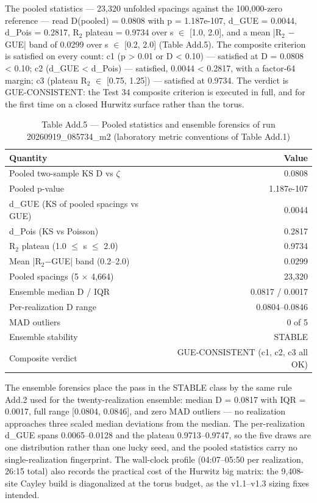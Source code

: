 \documentclass[10pt]{article}
\begin{document}
The pooled statistics --- 23,320 unfolded spacings against the 100,000-zero reference --- read D(pooled) = 0.0808 with p = 1.187e-107, d\_GUE = 0.0044, d\_Pois = 0.2817, R$_2$ plateau = 0.9734 over s $\in$ [1.0, 2.0], and a mean |R$_2$ $-$ GUE| band of 0.0299 over s $\in$ [0.2, 2.0] (Table Add.5). The composite criterion is satisfied on every count: c1 (p > 0.01 or D < 0.10) --- satisfied at D = 0.0808 < 0.10; c2 (d\_GUE < d\_Pois) --- satisfied, 0.0044 < 0.2817, with a factor-64 margin; c3 (plateau R$_2$ $\in$ [0.75, 1.25]) --- satisfied at 0.9734. The verdict is GUE-CONSISTENT: the Test 34 composite criterion is executed in full, and for the first time on a closed Hurwitz surface rather than the torus.


\begin{table}[tbp]\centering\small
\caption{Table Add.5 --- Pooled statistics and ensemble forensics of run 20260919\_085734\_m2 (laboratory metric conventions of Table Add.1)}
\begin{tabular}{lr}
\toprule
Quantity & Value \\
\midrule
Pooled two-sample KS D vs $\zeta$ & 0.0808 \\
Pooled p-value & 1.187e-107 \\
d\_GUE (KS of pooled spacings vs GUE) & 0.0044 \\
d\_Pois (KS vs Poisson) & 0.2817 \\
R$_2$ plateau (1.0 $\le$ s $\le$ 2.0) & 0.9734 \\
Mean |R$_2$$-$GUE| band (0.2--2.0) & 0.0299 \\
Pooled spacings (5 $\times$ 4,664) & 23,320 \\
Ensemble median D / IQR & 0.0817 / 0.0017 \\
Per-realization D range & 0.0804--0.0846 \\
MAD outliers & 0 of 5 \\
Ensemble stability & STABLE \\
Composite verdict & GUE-CONSISTENT (c1, c2, c3 all OK) \\
\bottomrule
\end{tabular}
\end{table}


The ensemble forensics place the pass in the STABLE class by the same rule Add.2 used for the twenty-realization ensemble: median D = 0.0817 with IQR = 0.0017, full range [0.0804, 0.0846], and zero MAD outliers --- no realization approaches three scaled median deviations from the median. The per-realization d\_GUE spans 0.0065--0.0128 and the plateau 0.9713--0.9747, so the five draws are one distribution rather than one lucky seed, and the pooled statistics carry no single-realization fingerprint. The wall-clock profile (04:07--05:50 per realization, 26:15 total) also records the practical cost of the Hurwitz big matrix: the 9,408-site Cayley build is diagonalized at the torus budget, as the v1.1--v1.3 sizing fixes intended.
\end{document}
